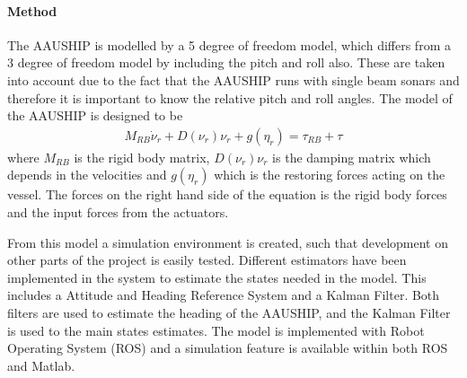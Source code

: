 \documentclass[a4paper,12pt]{article}
\begin{document}
\paragraph{Method}
The AAUSHIP is modelled by a 5 degree of freedom model, which differs
from a 3 degree of freedom model by including the pitch and roll also.
These are taken into account due to the fact that the AAUSHIP runs
with single beam sonars and therefore it is important to know the
relative pitch and roll angles. The model of the AAUSHIP is designed
to be
\begin{align}
M_{RB} \dot \nu_r + D(\nu_r)\nu_r + g(\eta_r) = \tau_{RB} + \tau
\end{align}
where $M_{RB}$ is the rigid body matrix, $D(\nu_r)\nu_r$ is the
damping matrix which depends in the velocities and $g(\eta_r)$ which
is the restoring forces acting on the vessel. The forces on the right
hand side of the equation is the rigid body forces and the input
forces from the actuators.

From this model a simulation environment is created, such that
development on other parts of the project is easily tested.  Different
estimators have been implemented in the system to estimate the states
needed in the model. This includes a Attitude and Heading Reference
System and a Kalman Filter. Both filters are used to estimate the
heading of the AAUSHIP, and the Kalman Filter is used to the main
states estimates. The model is implemented with Robot Operating System
(ROS) and a simulation feature is available within both ROS and Matlab.


\end{document}
